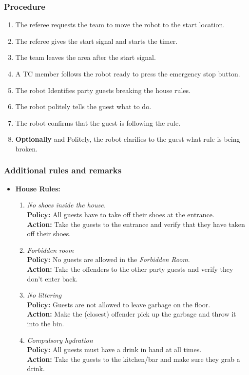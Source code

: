 \subsubsection*{Procedure}
	\begin{enumerate}[nosep]
		\item The referee requests the team to move the robot to the start location.
		\item The referee gives the start signal and starts the timer.
		\item The team leaves the area after the start signal.		
		\item A TC member follows the robot ready to press the emergency stop button.
		\item The robot Identifies party guests breaking the house rules.
		\item The robot politely tells the guest what to do. 
		\item The robot confirms that the guest is following the rule.	
		\item \textbf{Optionally} and Politely, the robot clarifies to the guest what rule is being broken.
	\end{enumerate}


\subsubsection*{Additional rules and remarks}
\begin{itemize}[nosep]
	\item \textbf{House Rules:}
	\begin{enumerate}[nosep]
		\item \textit{No shoes inside the house.}\\
		\textbf{Policy:} All guests have to take off their shoes at the entrance.\\
		\textbf{Action:} Take the guests to the entrance and verify that they have taken off their shoes.
	
		\item \textit{Forbidden room}\\
		\textbf{Policy:} No guests are allowed in the \emph{Forbidden Room}. \\
		\textbf{Action:} Take the offenders to the other party guests and verify they don't enter back.
	
		\item \textit{No littering}\\
		\textbf{Policy:} Guests are not allowed to leave garbage on the floor.\\
		\textbf{Action:} Make the (closest) offender pick up the garbage and throw it into the bin.
	
		\item \textit{Compulsory hydration}\\
		\textbf{Policy:} All guests must have a drink in hand at all times.\\
		\textbf{Action:} Take the guests to the kitchen/bar and make sure they grab a drink.
	\end{enumerate}
\end{itemize}

